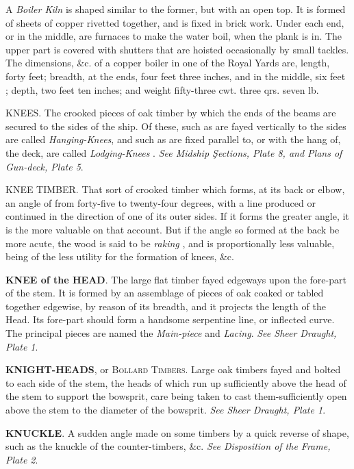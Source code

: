 A \textit{Boiler Kiln} is shaped similar to the former, but with an open top. It is formed of sheets of copper rivetted together, and is fixed in brick work. Under each end, or in the middle, are furnaces to make the water boil, when the plank is in. The upper part is covered with shutters that are hoisted occasionally by small tackles. The dimensions, \&c. of a copper boiler in one of the Royal Yards are, length, forty feet; breadth, at the ends, four feet three inches, and in the middle, six feet ; depth, two feet ten inches; and weight fifty-three cwt. three qrs. seven lb. 

KNEES. The crooked pieces of oak timber by which the ends of the beams are secured to the sides of the ship. Of these, such as are fayed vertically to the sides are called \textit{Hanging-Knees}, and such as are fixed parallel to, or with the hang of, the deck, are called \textit{Lodging-Knees} . \textit{See Midship Şections, Plate 8, and Plans of Gun-deck, Plate 5}. 

KNEE TIMBER. That sort of crooked timber which forms, at its back or elbow, an angle of from forty-five to twenty-four degrees, with a line produced or continued in the direction of one of its outer sides. If it forms the greater angle, it is the more valuable on that account. But if the angle so formed at the back be more acute, the wood is said to be \textit{raking} , and is proportionally less valuable, being of the less utility for the formation of knees, \&c. 

\textbf{KNEE of the HEAD}. The large flat timber fayed edgeways upon the fore-part of the stem. It is formed by an assemblage of pieces of oak coaked or tabled together edgewise, by reason of its breadth, and it projects the length of the Head. Its fore-part should form a handsome serpentine line, or inflected curve. The principal pieces are named the \textit{Main-piece} and \textit{Lacing}. \textit{See Sheer Draught, Plate 1}. 

\textbf{KNIGHT-HEADS}, or \textsc{Bollard Timbers}. Large oak timbers fayed and bolted to each side of the stem, the heads of which run up sufficiently above the head of the stem to support the bowsprit, care being taken to cast them-sufficiently open above the stem to the diameter of the bowsprit. \textit{See Sheer Draught, Plate 1}. 

\textbf{KNUCKLE}. A sudden angle made on some timbers by a quick reverse of shape, such as the knuckle of the counter-timbers, \&c. \textit{See Disposition of the Frame, Plate 2}. 

